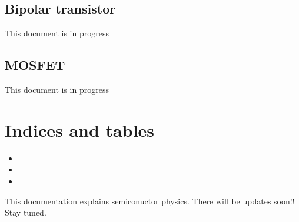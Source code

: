 \documentclass[a4paper,10pt,english]{sphinxmanual}
\begin{document}
\sphinxstepscope


\section{Bipolar transistor}
\label{\detokenize{Bipolar_transistor:bipolar-transistor}}\label{\detokenize{Bipolar_transistor::doc}}
\sphinxAtStartPar
This document is in progress

\sphinxstepscope


\section{MOSFET}
\label{\detokenize{MOSFET:mosfet}}\label{\detokenize{MOSFET::doc}}
\sphinxAtStartPar
This document is in progress


\chapter{Indices and tables}
\label{\detokenize{index:indices-and-tables}}\begin{itemize}
\item {} 
\sphinxAtStartPar
{}

\item {} 
\sphinxAtStartPar
{}

\item {} 
\sphinxAtStartPar
{}

\end{itemize}

\sphinxAtStartPar
This documentation explains semiconuctor physics.
There will be updates soon!!
Stay tuned.



\renewcommand{\indexname}{Index}
\printindex
\end{document}
